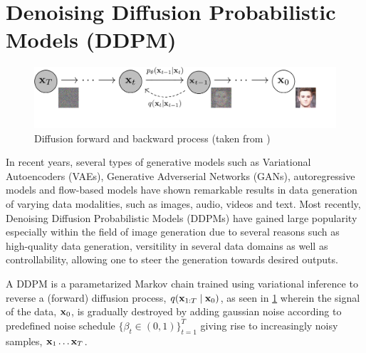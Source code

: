 \section{Denoising Diffusion Probabilistic Models (DDPM)}
\begin{figure}[H]
    \centering
    \includegraphics[width=\linewidth]{figures/pgm_diagram_xarrow_small.pdf}
    \caption{Diffusion forward and backward process (taken from \cite{ho2020denoising})}
    \label{fig:diffusion-process}
\end{figure}
In recent years, several types of generative models such as Variational Autoencoders (VAEs), Generative Adverserial Networks (GANs), autoregressive models and flow-based models have shown remarkable results in data generation of varying data modalities, such as images, audio, videos and text. Most recently, Denoising Diffusion Probabilistic Models (DDPMs) have gained large popularity especially within the field of image generation due to several reasons such as high-quality data generation, versitility in several data domains as well as controllability, allowing one to steer the generation towards desired outputs.

A DDPM is a parametarized Markov chain trained using variational inference to reverse a (forward) diffusion process, $q(\boldsymbol{\mathbf{x}}_{1:T} \mid \boldsymbol{\mathbf{x}}_0)$, as seen in \cref{fig:diffusion-process} wherein the signal of the data, $\boldsymbol{\mathbf{x}}_0$, is gradually destroyed by adding gaussian noise according to predefined noise schedule $\{\beta_t  \in (0,1) \}_{t=1}^T$ giving rise to increasingly noisy samples, $\boldsymbol{\mathbf{x}}_1 \ldots \boldsymbol{\mathbf{x}}_T$. 

